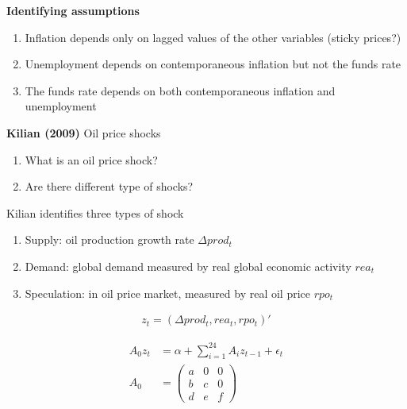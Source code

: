 \documentclass{beamer}
\begin{document}
\begin{frame}
  \textbf{Identifying assumptions}
\begin{enumerate}
  \item Inflation depends only on lagged values of the other variables (sticky prices?)
  \item Unemployment depends on contemporaneous inflation but not the funds rate
  \item The funds rate depends on both contemporaneous inflation and unemployment
\end{enumerate}
\end{frame}


\begin{frame}
 \textbf{Kilian (2009)} Oil price shocks\\
\begin{enumerate}
  \item What is an oil price shock?
  \item Are there different type of shocks?
\end{enumerate}
 \medskip
 Kilian identifies three types of shock
\begin{enumerate}
  \item Supply: oil production growth rate $\Delta prod_t$
  \item Demand: global demand measured by real global economic activity $rea_t$
  \item Speculation: in oil price market, measured by real oil price $rpo_t$ 
\end{enumerate}
\end{frame}

\begin{frame}
\begin{align}
  z_t=(\Delta prod_t, rea_t, rpo_t)'
\end{align}

  \begin{align*}
   A_0 z_t &= \alpha + \sum_{i=1}^{24} A_i z_{t-1} + \epsilon_t\\
   A_0 &= \begin{pmatrix}
     a & 0 & 0\\
     b & c & 0\\
     d & e & f
    \end{pmatrix} 
\end{align*}
\end{frame}
\end{document}
